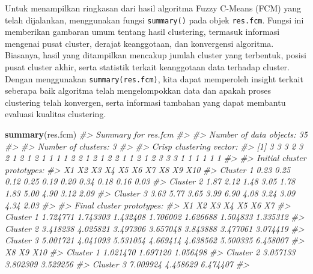 \documentclass[
  oneside]{book}
\newenvironment{Shaded}{\begin{snugshade}}{\end{snugshade}}
\newcommand{\CommentTok}[1]{\textcolor[rgb]{0.56,0.35,0.01}{\textit{#1}}}
\newcommand{\FunctionTok}[1]{\textcolor[rgb]{0.13,0.29,0.53}{\textbf{#1}}}
\newcommand{\NormalTok}[1]{#1}
\begin{document}
Untuk menampilkan ringkasan dari hasil algoritma Fuzzy C-Means (FCM) yang telah dijalankan, menggunakan fungsi \texttt{summary()} pada objek \texttt{res.fcm}. Fungsi ini memberikan gambaran umum tentang hasil clustering, termasuk informasi mengenai pusat cluster, derajat keanggotaan, dan konvergensi algoritma. Biasanya, hasil yang ditampilkan mencakup jumlah cluster yang terbentuk, posisi pusat cluster akhir, serta statistik terkait keanggotaan data terhadap cluster. Dengan menggunakan \texttt{summary(res.fcm)}, kita dapat memperoleh insight terkait seberapa baik algoritma telah mengelompokkan data dan apakah proses clustering telah konvergen, serta informasi tambahan yang dapat membantu evaluasi kualitas clustering.

\begin{Shaded}
\begin{Highlighting}[]
\FunctionTok{summary}\NormalTok{(res.fcm)}
\CommentTok{\#\textgreater{} Summary for \textquotesingle{}res.fcm\textquotesingle{}}
\CommentTok{\#\textgreater{} }
\CommentTok{\#\textgreater{} Number of data objects:  35 }
\CommentTok{\#\textgreater{} }
\CommentTok{\#\textgreater{} Number of clusters:  3 }
\CommentTok{\#\textgreater{} }
\CommentTok{\#\textgreater{} Crisp clustering vector:}
\CommentTok{\#\textgreater{}  [1] 3 3 3 2 3 2 1 2 1 2 1 1 1 1 2 2 1 2 1 2 2 1 1 2 1 2 3 3 3 1 1 1 1 1 1}
\CommentTok{\#\textgreater{} }
\CommentTok{\#\textgreater{} Initial cluster prototypes:}
\CommentTok{\#\textgreater{}             X1   X2   X3   X4   X5   X6   X7   X8   X9  X10}
\CommentTok{\#\textgreater{} Cluster 1 0.23 0.25 0.12 0.25 0.19 0.20 0.34 0.18 0.16 0.03}
\CommentTok{\#\textgreater{} Cluster 2 1.87 2.12 1.48 3.05 1.78 1.83 5.00 4.90 3.12 2.09}
\CommentTok{\#\textgreater{} Cluster 3 3.63 5.77 3.65 3.99 6.90 4.08 3.24 3.09 4.34 2.03}
\CommentTok{\#\textgreater{} }
\CommentTok{\#\textgreater{} Final cluster prototypes:}
\CommentTok{\#\textgreater{}                 X1       X2       X3       X4       X5       X6       X7}
\CommentTok{\#\textgreater{} Cluster 1 1.724771 1.743303 1.432408 1.706002 1.626688 1.504833 1.335312}
\CommentTok{\#\textgreater{} Cluster 2 3.418238 4.025821 3.497306 3.657048 3.843888 3.477061 3.074419}
\CommentTok{\#\textgreater{} Cluster 3 5.001721 4.041093 5.531054 4.669414 4.638562 5.500335 6.458007}
\CommentTok{\#\textgreater{}                 X8       X9      X10}
\CommentTok{\#\textgreater{} Cluster 1 1.021470 1.697120 1.056498}
\CommentTok{\#\textgreater{} Cluster 2 3.057133 3.802309 3.529256}
\CommentTok{\#\textgreater{} Cluster 3 7.009924 4.458629 6.474407}
\CommentTok{\#\textgreater{} }

\end{Highlighting}
\end{Shaded}
\end{document}
